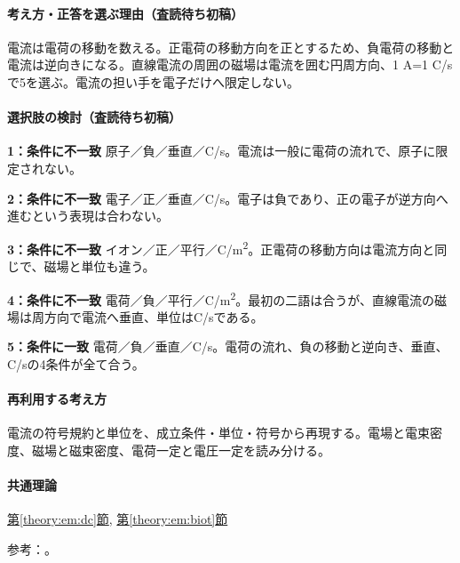 \paragraph{考え方・正答を選ぶ理由（査読待ち初稿）} 電流は電荷の移動を数える。正電荷の移動方向を正とするため、負電荷の移動と電流は逆向きになる。直線電流の周囲の磁場は電流を囲む円周方向、1 A=\allowbreak{}1 C/sで5を選ぶ。電流の担い手を電子だけへ限定しない。

\paragraph{選択肢の検討（査読待ち初稿）}\mbox{}\par

\noindent\textbf{1：条件に不一致} 原子／負／垂直／C/s。電流は一般に電荷の流れで、原子に限定されない。\par

\noindent\textbf{2：条件に不一致} 電子／正／垂直／C/s。電子は負であり、正の電子が逆方向へ進むという表現は合わない。\par

\noindent\textbf{3：条件に不一致} イオン／正／平行／C/m\textsuperscript{2}。正電荷の移動方向は電流方向と同じで、磁場と単位も違う。\par

\noindent\textbf{4：条件に不一致} 電荷／負／平行／C/m\textsuperscript{2}。最初の二語は合うが、直線電流の磁場は周方向で電流へ垂直、単位はC/sである。\par

\noindent\textbf{5：条件に一致} 電荷／負／垂直／C/s。電荷の流れ、負の移動と逆向き、垂直、C/sの4条件が全て合う。\par

\paragraph{再利用する考え方} 電流の符号規約と単位を、成立条件・単位・符号から再現する。電場と電束密度、磁場と磁束密度、電荷一定と電圧一定を読み分ける。

\paragraph{共通理論} \hyperref[theory:em:dc]{第\ref*{theory:em:dc}節}, \hyperref[theory:em:biot]{第\ref*{theory:em:biot}節}

\par 参考：\cite{mit_em06,mit_em09}。

